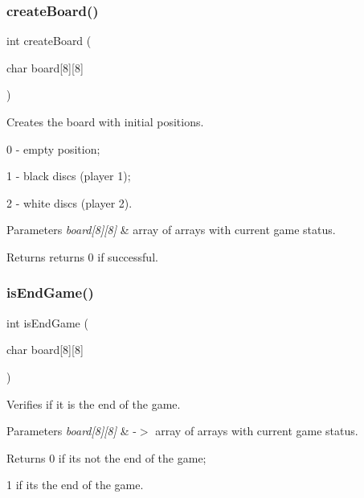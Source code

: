 \subsubsection{\texorpdfstring{create\+Board()}{createBoard()}}
{\footnotesize\ttfamily int create\+Board (\begin{DoxyParamCaption}\item[{char}]{board\mbox{[}8\mbox{]}\mbox{[}8\mbox{]} }\end{DoxyParamCaption})}



Creates the board with initial positions. 

0 -\/ empty position;

1 -\/ black discs (player 1);

2 -\/ white discs (player 2).


\begin{DoxyParams}{Parameters}
{\em board\mbox{[}8\mbox{]}\mbox{[}8\mbox{]}} & array of arrays with current game status. \\
\hline
\end{DoxyParams}
\begin{DoxyReturn}{Returns}
returns 0 if successful. 
\end{DoxyReturn}
\hypertarget{group___program_logic_gacfd2089a907444dab0ccd2d95f321b8b}{}\label{group___program_logic_gacfd2089a907444dab0ccd2d95f321b8b} 
\subsubsection{\texorpdfstring{is\+End\+Game()}{isEndGame()}}
{\footnotesize\ttfamily int is\+End\+Game (\begin{DoxyParamCaption}\item[{char}]{board\mbox{[}8\mbox{]}\mbox{[}8\mbox{]} }\end{DoxyParamCaption})}



Verifies if it is the end of the game. 


\begin{DoxyParams}{Parameters}
{\em board\mbox{[}8\mbox{]}\mbox{[}8\mbox{]}} & -\/$>$ array of arrays with current game status. \\
\hline
\end{DoxyParams}
\begin{DoxyReturn}{Returns}
0 if it\textquotesingle{}s not the end of the game; 

1 if it\textquotesingle{}s the end of the game. 
\end{DoxyReturn}
\hypertarget{group___program_logic_gaed1b217c7e40a6fb27a0e6a719594aba}{}\label{group___program_logic_gaed1b217c7e40a6fb27a0e6a719594aba} 

